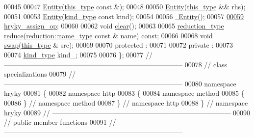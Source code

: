 \begin{DoxyCode}
00045 
00047     \hyperlink{classhryky_1_1http_1_1method_1_1_entity_afc0427c309ca95105eeda86095bd7773}{Entity}(\hyperlink{classhryky_1_1http_1_1method_1_1_entity}{this_type} \textcolor{keyword}{const} &);
00048 
00050     \hyperlink{classhryky_1_1http_1_1method_1_1_entity_afc0427c309ca95105eeda86095bd7773}{Entity}(\hyperlink{classhryky_1_1http_1_1method_1_1_entity}{this_type} && rhs);
00051 
00053     \hyperlink{classhryky_1_1http_1_1method_1_1_entity_afc0427c309ca95105eeda86095bd7773}{Entity}(\hyperlink{classhryky_1_1_kind}{kind_type} \textcolor{keyword}{const} kind);
00054 
00056     \hyperlink{classhryky_1_1http_1_1method_1_1_entity_a972aa8a766ee5e20f742f8694d55f17f}{~Entity}();
00057 
\hypertarget{http__method__entity_8h_source_l00059}{}\hyperlink{classhryky_1_1http_1_1method_1_1_entity_afec9520084c04892ec3d09ca4a900042}{00059}     \hyperlink{classhryky_1_1http_1_1method_1_1_entity_afec9520084c04892ec3d09ca4a900042}{hryky_assign_op};
00060 
00062     \textcolor{keywordtype}{void} \hyperlink{classhryky_1_1http_1_1method_1_1_entity_a6ef7841c5cd1abeb83b3add076fe1d73}{clear}();
00063 
00065     \hyperlink{classhryky_1_1_intrusive_ptr}{reduction_type} \hyperlink{classhryky_1_1http_1_1method_1_1_entity_af566f6444977307aae49759f466ca0ea}{reduce}(\hyperlink{classhryky_1_1reduction_1_1_string}{reduction::name_type} \textcolor{keyword}{const} & name) \textcolor{keyword}{const};
00066 
00068     \textcolor{keywordtype}{void} \hyperlink{classhryky_1_1http_1_1method_1_1_entity_a5e7fb9634f8b20eca0b6d14b04ed01e4}{swap}(\hyperlink{classhryky_1_1http_1_1method_1_1_entity}{this_type} & src);
00069 
00070 \textcolor{keyword}{protected} :
00071 
00072 \textcolor{keyword}{private} :
00073 
00074     \hyperlink{classhryky_1_1_kind}{kind_type} kind\_;
00075 
00076 \};
00077 \textcolor{comment}{//
      ------------------------------------------------------------------------------}
00078 \textcolor{comment}{// class specializations}
00079 \textcolor{comment}{//
      ------------------------------------------------------------------------------}
00080 \textcolor{keyword}{namespace }hryky
00081 \{
00082 \textcolor{keyword}{namespace }http
00083 \{
00084 \textcolor{keyword}{namespace }method
00085 \{
00086 \} \textcolor{comment}{// namespace method}
00087 \} \textcolor{comment}{// namespace http}
00088 \} \textcolor{comment}{// namespace hryky}
00089 \textcolor{comment}{//
      ------------------------------------------------------------------------------}
00090 \textcolor{comment}{// public member functions}
00091 \textcolor{comment}{//
      ------------------------------------------------------------------------------}

\end{DoxyCode}
